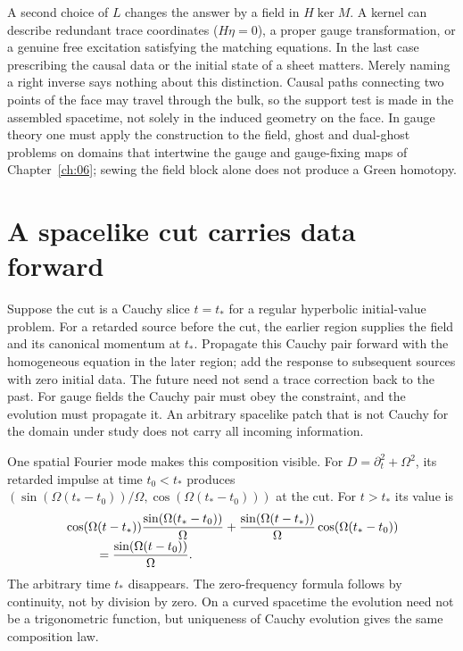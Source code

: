 A second choice of $L$ changes the answer by a field in $H\ker M$. A kernel can describe redundant trace coordinates ($H\eta=0$), a proper gauge transformation, or a genuine free excitation satisfying the matching equations. In the last case prescribing the causal data or the initial state of a sheet matters. Merely naming a right inverse says nothing about this distinction. Causal paths connecting two points of the face may travel through the bulk, so the support test is made in the assembled spacetime, not solely in the induced geometry on the face. In gauge theory one must apply the construction to the field, ghost and dual-ghost problems on domains that intertwine the gauge and gauge-fixing maps of Chapter~\ref{ch:06}; sewing the field block alone does not produce a Green homotopy.

\section{A spacelike cut carries data forward}
Suppose the cut is a Cauchy slice $t=t_*$ for a regular hyperbolic initial-value problem. For a retarded source before the cut, the earlier region supplies the field and its canonical momentum at $t_*$. Propagate this Cauchy pair forward with the homogeneous equation in the later region; add the response to subsequent sources with zero initial data. The future need not send a trace correction back to the past. For gauge fields the Cauchy pair must obey the constraint, and the evolution must propagate it. An arbitrary spacelike patch that is not Cauchy for the domain under study does not carry all incoming information.

One spatial Fourier mode makes this composition visible. For $D=\partial_t^2+\Omega^2$, its retarded impulse at time $t_0<t_*$ produces $(\sin(\Omega(t_*-t_0))/\Omega,\cos(\Omega(t_*-t_0)))$ at the cut. For $t>t_*$ its value is
\begin{align*}
 &\cos(\Omega(t-t_*))\frac{\sin(\Omega(t_*-t_0))}{\Omega}
 +\frac{\sin(\Omega(t-t_*))}{\Omega}\cos(\Omega(t_*-t_0))\\[-1mm]
 &\hspace{2.5em}=\frac{\sin(\Omega(t-t_0))}{\Omega}.
\end{align*}
The arbitrary time $t_*$ disappears. The zero-frequency formula follows by continuity, not by division by zero. On a curved spacetime the evolution need not be a trigonometric function, but uniqueness of Cauchy evolution gives the same composition law.

